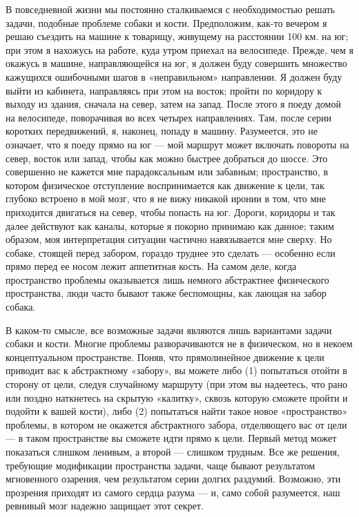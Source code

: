 В повседневной жизни мы постоянно сталкиваемся с необходимостью решать задачи, подобные проблеме собаки и кости. Предположим, как-то вечером я решаю съездить на машине к товарищу, живущему на расстоянии 100 км. на юг; при этом я нахожусь на работе, куда утром приехал на велосипеде. Прежде, чем я окажусь в машине, направляющейся на юг, я должен буду совершить множество кажущихся ошибочными шагов в «неправильном» направлении. Я должен буду выйти из кабинета, направляясь при этом на восток; пройти по коридору к выходу из здания, сначала на север, затем на запад. После этого я поеду домой на велосипеде, поворачивая во всех четырех направлениях. Там, после серии коротких передвижений, я, наконец, попаду в машину. Разумеется, это не означает, что я поеду прямо на юг --- мой маршрут может включать повороты на север, восток или запад, чтобы как можно быстрее добраться до шоссе. Это совершенно не кажется мне парадоксальным или забавным; пространство, в котором физическое отступление воспринимается как движение к цели, так глубоко встроено в мой мозг, что я не вижу никакой иронии в том, что мне приходится двигаться на север, чтобы попасть на юг. Дороги, коридоры и так далее действуют как каналы, которые я покорно принимаю как данное; таким образом, моя интерпретация ситуации частично навязывается мне сверху. Но собаке, стоящей перед забором, гораздо труднее это сделать --- особенно если прямо перед ее носом лежит аппетитная кость. На самом деле, когда пространство проблемы оказывается лишь немного абстрактнее физического пространства, люди часто бывают также беспомощны, как лающая на забор собака.

В каком-то смысле, все возможные задачи являются лишь вариантами задачи собаки и кости. Многие проблемы разворачиваются не в физическом, но в некоем концептуальном пространстве. Поняв, что прямолинейное движение к цели приводит вас к абстрактному «забору», вы можете либо (1) попытаться отойти в сторону от цели, следуя случайному маршруту (при этом вы надеетесь, что рано или поздно наткнетесь на скрытую «калитку», сквозь которую сможете пройти и подойти к вашей кости), либо (2) попытаться найти такое новое «пространство» проблемы, в котором не окажется абстрактного забора, отделяющего вас от цели --- в таком пространстве вы сможете идти прямо к цели. Первый метод может показаться слишком ленивым, а второй --- слишком трудным. Все же решения, требующие модификации пространства задачи, чаще бывают результатом мгновенного озарения, чем результатом серии долгих раздумий. Возможно, эти прозрения приходят из самого сердца разума --- и, само собой разумеется, наш ревнивый мозг надежно защищает этот секрет.

